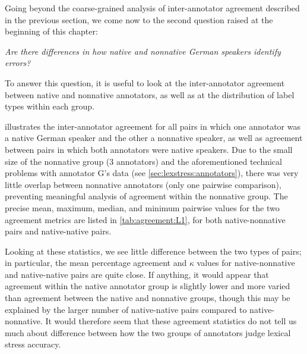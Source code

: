 		
		
		Going beyond the coarse-grained analysis of inter-annotator agreement described in the previous section, we come now to the second question raised at the beginning of this chapter:
		
		\textit{Are there differences in how native and nonnative German speakers identify errors?}
		
		
		To answer this question, it is useful to look at the inter-annotator agreement between native and nonnative annotators, as well as at the distribution of label types within each group. 
		
		 illustrates the inter-annotator agreement for all pairs in which one annotator was a native German speaker and the other a nonnative speaker, as well as agreement between pairs in which both annotators were native speakers. Due to the small size of the nonnative group (3 annotators) and the aforementioned technical problems with annotator G's data (see \cref{sec:lexstress:annotators}), there was very little overlap between nonnative annotators (only one pairwise comparison), preventing meaningful analysis of agreement within the nonnative group. The precise mean, maximum, median, and minimum pairwise values for the two agreement metrics are listed in \cref{tab:agreement:L1}, for both  native-nonnative pairs and native-native pairs. 
		
		Looking at these statistics, we see little difference between the two types of pairs; in particular, the mean percentage agreement and $\kappa$ values for native-nonnative and native-native pairs are quite close.  If anything, it would appear that agreement within the native annotator group is slightly lower and more varied than agreement between the native and nonnative groups, though this may be explained by the larger number of native-native pairs compared to native-nonnative. It would therefore seem that these agreement statistics do not tell us much about difference between how the two groups of annotators judge lexical stress accuracy.
		
